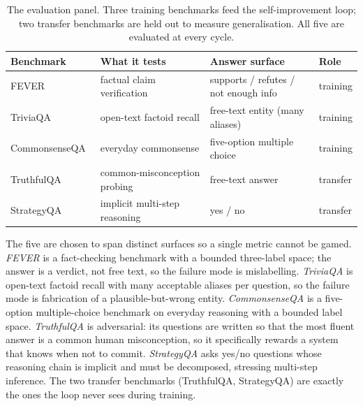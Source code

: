 \begin{table}[htbp]
\centering
\small
\begin{tabular}{@{}llll@{}}
\toprule
\textbf{Benchmark} & \textbf{What it tests} & \textbf{Answer surface} & \textbf{Role} \\
\midrule
FEVER~\cite{thorne-etal-2018-fever}                 & factual claim verification    & supports / refutes / not enough info & training \\
TriviaQA~\cite{joshi-etal-2017-triviaqa}            & open-text factoid recall      & free-text entity (many aliases)      & training \\
CommonsenseQA~\cite{talmor-etal-2019-commonsenseqa} & everyday commonsense          & five-option multiple choice          & training \\
TruthfulQA~\cite{lin-etal-2022-truthfulqa}          & common-misconception probing  & free-text answer                     & transfer \\
StrategyQA~\cite{geva2021strategyqa}                & implicit multi-step reasoning & yes / no                             & transfer \\
\bottomrule
\end{tabular}
\caption[The five-benchmark panel]{The evaluation panel. Three training benchmarks
feed the self-improvement loop; two transfer benchmarks are held out to measure
generalisation. All five are evaluated at every cycle.}
\label{tab:benchmarks}
\end{table}

\begin{precise}
The five are chosen to span distinct surfaces so a single metric cannot be gamed.
\emph{FEVER} is a fact-checking benchmark with a bounded three-label space; the
answer is a verdict, not free text, so the failure mode is mislabelling.
\emph{TriviaQA} is open-text factoid recall with many acceptable aliases per
question, so the failure mode is fabrication of a plausible-but-wrong entity.
\emph{CommonsenseQA} is a five-option multiple-choice benchmark on everyday
reasoning with a bounded label space. \emph{TruthfulQA} is adversarial: its
questions are written so that the most fluent answer is a common human
misconception, so it specifically rewards a system that knows when not to commit.
\emph{StrategyQA} asks yes/no questions whose reasoning chain is implicit and must
be decomposed, stressing multi-step inference. The two transfer benchmarks
(TruthfulQA, StrategyQA) are exactly the ones the loop never sees during training.
\end{precise}

